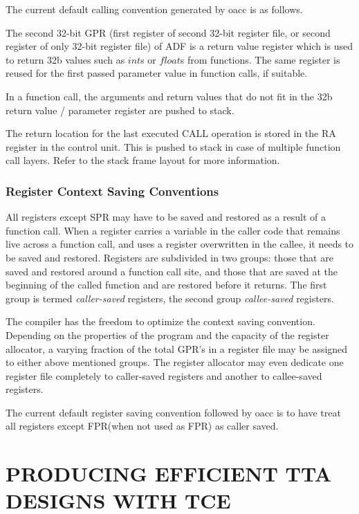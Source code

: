 \documentclass[a4paper,twoside]{tceusermanual}
\begin{document}
The current default calling convention generated by oacc is as follows.

The second 32-bit GPR (first register of second 32-bit register file,
or second register of only 32-bit register file) of ADF
is a return value register which is used to return 
32b values such as $int$s or $float$s from functions. 
The same register is reused for the first 
passed parameter value in function calls, if suitable. 

In a function call, the arguments and return values that do not fit 
in the 32b return value / parameter register are pushed to stack.

The return location for the last executed CALL operation is 
stored in the RA register in the control unit. This is pushed 
to stack in case of multiple function call layers. Refer to the 
stack frame layout for more information.


\subsection{Register Context Saving Conventions}
\label{ssec:register-conventions}

All registers except SPR may have to be saved and restored as a result of a
function call.  When a register carries a variable in the caller code that
remains live across a function call, and uses a register overwritten in the callee, 
it needs to be saved and restored.  Registers are subdivided in two groups:
those that are saved and restored around a function call site, and those that are
saved at the beginning of the called function and are restored before it 
returns. The first group is termed \textit{caller-saved} registers, the second 
group \textit{callee-saved} registers.

The compiler has the freedom to optimize the context saving convention.
Depending on the properties of the program and the capacity of the register
allocator, a varying fraction of the total GPR's in a register file may be
assigned to either above mentioned groups.  The register allocator may even 
dedicate one register file completely to caller-saved registers and another 
to callee-saved registers.

The current default register saving convention followed by oacc is to have 
treat all registers except FPR(when not used as FPR) as caller saved.

\chapter{PRODUCING EFFICIENT TTA DESIGNS WITH TCE}
\end{document}
